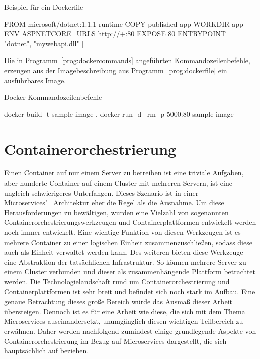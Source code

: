 \begin{program}[!hbt]
\caption{Beispiel für ein Dockerfile}
\label{prog:dockerfile}
\begin{DockerCode}
FROM microsoft/dotnet:1.1.1-runtime
COPY published app
WORKDIR app
ENV ASPNETCORE_URLS http://+:80 
EXPOSE 80
ENTRYPOINT [ "dotnet", "mywebapi.dll" ]
\end{DockerCode}
\end{program}

Die in Programm~\ref{prog:dockercommands} angeführten Kommandozeilenbefehle, erzeugen aus der Imagebeschreibung aus Programm~\ref{prog:dockerfile} ein ausführbares Image.

\begin{program}[!hbt]
\caption{Docker Kommandozeilenbefehle}
\label{prog:dockercommands}
\begin{GenericCode}
docker build -t sample-image .
docker run -d --rm -p 5000:80 sample-image
\end{GenericCode}
\end{program}

\section{Containerorchestrierung}

Einen Container auf nur einem Server zu betreiben ist eine triviale Aufgaben, aber hunderte Container auf einem Cluster mit mehreren Servern, ist eine ungleich schwierigeres Unterfangen. Dieses Szenario ist in einer Microservices"=Architektur eher die Regel als die Ausnahme. Um diese Herausforderungen zu bewältigen, wurden eine Vielzahl von sogenannten Containerorchestrierungswerkzeugen und Containerplattformen entwickelt \bzw werden noch immer entwickelt. Eine wichtige Funktion von diesen Werkzeugen ist es mehrere Container zu einer logischen Einheit zusammenzuschließen, sodass diese auch als Einheit verwaltet werden kann. Des weiteren bieten diese Werkzeuge eine Abstraktion der tatsächlichen Infrastruktur. So können mehrere Server zu einem Cluster verbunden und dieser als zusammenhängende Plattform betrachtet werden. Die Technologielandschaft rund um Containerorchestrierung und Containerplattformen ist sehr breit und befindet sich noch stark im Aufbau. Eine genaue Betrachtung dieses große Bereich würde das Ausmaß dieser Arbeit übersteigen. Dennoch ist es für eine Arbeit wie diese, die sich mit dem Thema Microservices auseinandersetzt, unumgänglich diesen wichtigen Teilbereich zu erwähnen. Daher werden nachfolgend zumindest einige grundlegende Aspekte von Containerorchestrierung im Bezug auf Microservices dargestellt, die sich hauptsächlich auf \cite{ContainerOrcaWars} beziehen. 

